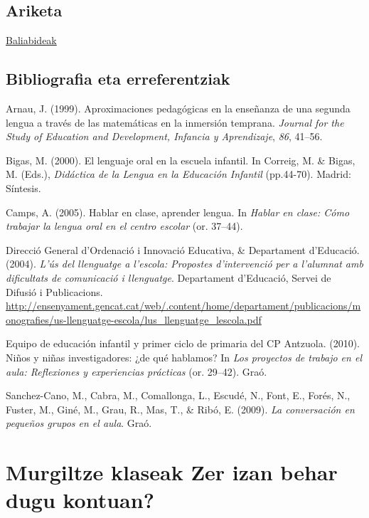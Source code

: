 \documentclass[
]{book}
\begin{document}
\hypertarget{ariketa}{%
\section*{Ariketa}\label{ariketa}}

\href{../Baliabideak/05_ahozko_hizkuntza/Ahozkoa_eskolan-Lantzekoak.pdf}{Baliabideak}

\hypertarget{bibliografia-eta-erreferentziak}{%
\section*{Bibliografia eta erreferentziak}\label{bibliografia-eta-erreferentziak}}

Arnau, J. (1999). Aproximaciones pedagógicas en la enseñanza de una segunda lengua a través de las matemáticas en la inmersión temprana. \emph{Journal for the Study of Education and Development, Infancia y Aprendizaje}, \emph{86}, 41--56.

Bigas, M. (2000). El lenguaje oral en la escuela infantil. In Correig, M. \& Bigas, M. (Eds.), \emph{Didáctica de la Lengua en la Educación Infantil} (pp.44-70). Madrid: Síntesis.

Camps, A. (2005). Hablar en clase, aprender lengua. In \emph{Hablar en clase: Cómo trabajar la lengua oral en el centro escolar} (or. 37--44).

Direcció General d'Ordenació i Innovació Educativa, \& Departament d'Educació. (2004). \emph{L'ús del llenguatge a l'escola: Propostes d'intervenció per a l'alumnat amb dificultats de comunicació i llenguatge}. Departament d'Educació, Servei de Difusió i Publicacions. \url{http://ensenyament.gencat.cat/web/.content/home/departament/publicacions/monografies/us-llenguatge-escola/lus_llenguatge_lescola.pdf}

Equipo de educación infantil y primer ciclo de primaria del CP Antzuola. (2010). Niños y niñas investigadores: ¿de qué hablamos? In \emph{Los proyectos de trabajo en el aula: Reflexiones y experiencias prácticas} (or. 29--42). Graó.

Sanchez-Cano, M., Cabra, M., Comallonga, L., Escudé, N., Font, E., Forés, N., Fuster, M., Giné, M., Grau, R., Mas, T., \& Ribó, E. (2009). \emph{La conversación en pequeños grupos en el aula}. Graó.

\hypertarget{murgiltze-klaseak-zer-izan-behar-dugu-kontuan}{%
\chapter{\texorpdfstring{Murgiltze klaseak Zer izan behar dugu kontuan?}{Murgiltze klaseak  Zer izan behar dugu kontuan?}}\label{murgiltze-klaseak-zer-izan-behar-dugu-kontuan}}
\end{document}
